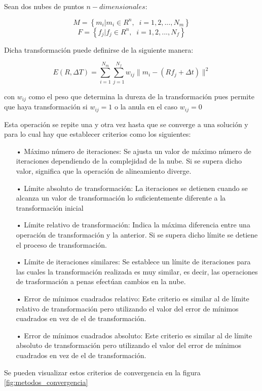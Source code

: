 Sean dos nubes de puntos $n-dimensionales$:

$$M=\left\lbrace m_{i} | m_{i} \in R^n,\;\;i=1,2,...,N_{m} \right\rbrace$$
$$F=\left\lbrace f_{j} | f_{j} \in R^n,\;\;i=1,2,...,N_{f} \right\rbrace$$

Dicha transformación puede definirse de la siguiente manera:

$$E(R,\Delta T)=\sum_{i=1}^{N_m} \sum_{j=1}^{N_f} w_{ij} \| m_{i}-(Rf_{j}+\Delta t)  \|^2$$


con $w_{ij}$ como el peso que determina la dureza de la transformación pues permite que haya transformación si $w_{ij}=1$ o la anula en el caso $w_{ij}=0$

Esta operación se repite una y otra vez hasta que se converge a una solución y para lo cual hay que establecer criterios como los siguientes:

\begin{itemize}
\item[•]Máximo número de iteraciones:
Se ajusta un valor de máximo número de iteraciones dependiendo de la complejidad de la nube. Si se supera dicho valor, significa que la operación de alineamiento diverge.
\item[•]Límite absoluto de transformación: 
La iteraciones se detienen cuando se alcanza un valor de transformación lo suficientemente diferente a la transformación inicial
\item[•]Límite relativo de transformación:
Indica la máxima diferencia entre una operación de transformación y la anterior. Si se supera dicho límite se detiene el proceso de transformación.
\item[•]Límite de iteraciones similares: 
Se establece un límite de iteraciones para las cuales la transformación realizada es muy similar, es decir, las operaciones de trasformación a penas efectúan cambios en la nube.
\item[•]Error de mínimos cuadrados relativo:
Este criterio es similar al de límite relativo de transformación pero utilizando el valor del error de mínimos cuadrados en vez de el de transformación.
\item[•]Error de mínimos cuadrados absoluto:
Este criterio es similar al de límite absoluto de transformación pero utilizando el valor del error de mínimos cuadrados en vez de el de transformación.
\end{itemize}

Se pueden visualizar estos criterios de convergencia en la figura \ref{fig:metodos_convergencia}


